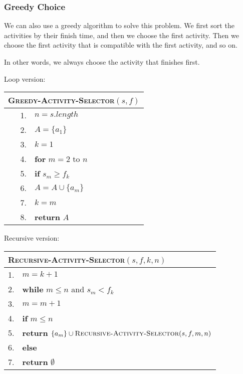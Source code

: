 \documentclass[a4paper,12pt]{article}
\begin{document}
\subsubsection{Greedy Choice}

We can also use a greedy algorithm to solve this problem.
We first sort the activities by their finish time, and then we choose the first activity.
Then we choose the first activity that is compatible with the first activity, and so on.

In other words, we always choose the activity that finishes first.

Loop version:
\begin{center}
	\begin{tabular}{rl}
		\toprule
		\multicolumn{2}{l}{\textsc{Greedy-Activity-Selector}$(s, f)$} \\
		\midrule
		1. & $n = s.length$ \\
		2. & $A = \{a_1\}$ \\
		3. & $k = 1$ \\
		4. & \textbf{for} $m = 2$ to $n$ \\
		5. & \quad \textbf{if} $s_m \geq f_k$ \\
		6. & \quad \quad $A = A \cup \{a_m\}$ \\
		7. & \quad \quad $k = m$ \\
		8. & \textbf{return} $A$ \\
		\bottomrule
	\end{tabular}
\end{center}

Recursive version:
\begin{center}
	\begin{tabular}{rl}
		\toprule
		\multicolumn{2}{l}{\textsc{Recursive-Activity-Selector}$(s, f, k, n)$} \\
		\midrule
		1. & $m = k + 1$ \\
		2. & \textbf{while} $m \leq n$ and $s_m < f_k$ \\
		3. & \quad $m = m + 1$ \\
		4. & \textbf{if} $m \leq n$ \\
		5. & \quad \textbf{return} $\{a_m\} \cup \textsc{Recursive-Activity-Selector}(s, f, m, n)$ \\
		6. & \textbf{else} \\
		7. & \quad \textbf{return} $\emptyset$ \\
		\bottomrule
	\end{tabular}
\end{center}
\end{document}
